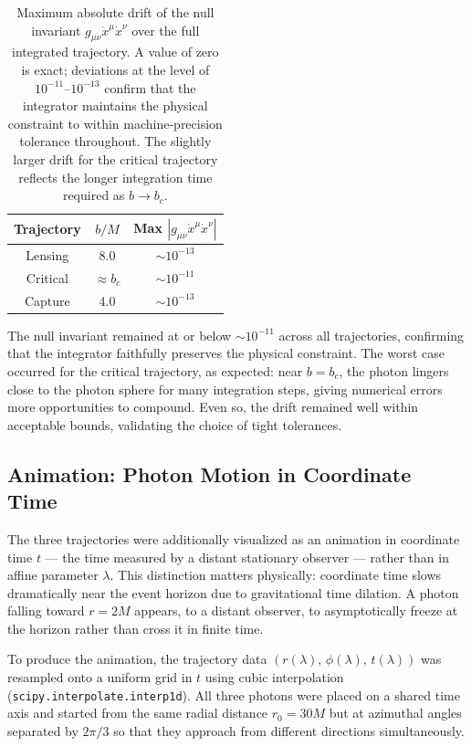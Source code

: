 \documentclass[12pt,a4paper]{article}
\begin{document}
\begin{table}[h]
    \centering
    \begin{tabular}{ccc}
        \hline
        Trajectory & $b/M$ & Max $|g_{\mu\nu}\dot{x}^\mu\dot{x}^\nu|$ \\
        \hline
        Lensing  & 8.0 & $\sim 10^{-13}$ \\
        Critical & $\approx b_c$ & $\sim 10^{-11}$ \\
        Capture  & 4.0 & $\sim 10^{-13}$ \\
        \hline
    \end{tabular}
    \caption{Maximum absolute drift of the null invariant $g_{\mu\nu}\dot{x}^\mu\dot{x}^\nu$ over the full integrated trajectory. A value of zero is exact; deviations at the level of $10^{-11}$--$10^{-13}$ confirm that the integrator maintains the physical constraint to within machine-precision tolerance throughout. The slightly larger drift for the critical trajectory reflects the longer integration time required as $b \to b_c$.}
    \label{tab:null}
\end{table}

The null invariant remained at or below $\sim 10^{-11}$ across all trajectories, confirming that the integrator faithfully preserves the physical constraint. The worst case occurred for the critical trajectory, as expected: near $b = b_c$, the photon lingers close to the photon sphere for many integration steps, giving numerical errors more opportunities to compound. Even so, the drift remained well within acceptable bounds, validating the choice of tight tolerances.

\subsection{Animation: Photon Motion in Coordinate Time}

The three trajectories were additionally visualized as an animation in coordinate time $t$ — the time measured by a distant stationary observer — rather than in affine parameter $\lambda$. This distinction matters physically: coordinate time slows dramatically near the event horizon due to gravitational time dilation. A photon falling toward $r = 2M$ appears, to a distant observer, to asymptotically freeze at the horizon rather than cross it in finite time.

To produce the animation, the trajectory data $(r(\lambda),\, \phi(\lambda),\, t(\lambda))$ was resampled onto a uniform grid in $t$ using cubic interpolation (\texttt{scipy.interpolate.interp1d}). All three photons were placed on a shared time axis and started from the same radial distance $r_0 = 30M$ but at azimuthal angles separated by $2\pi/3$ so that they approach from different directions simultaneously.
\end{document}
